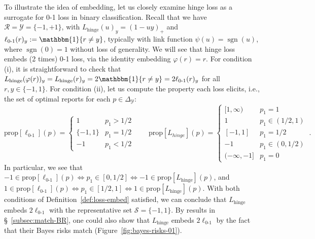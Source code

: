 \documentclass[twoside,11pt]{article}
\newcommand{\prop}[1]{\mathrm{prop}[#1]}
\newcommand{\simplex}{\Delta_\Y}
\newcommand{\R}{\mathcal{R}}
\newcommand{\Sc}{\mathcal{S}}
\newcommand{\Y}{\mathcal{Y}}
\newcommand{\ones}{\mathbbm{1}}
\newcommand{\Ind}[1]{\ones\{#1\}}
\newcommand{\hinge}{L_{\mathrm{hinge}}}
\newcommand{\ellzo}{\ell_{\text{0-1}}}
\DeclareMathOperator*{\sgn}{sgn}
\begin{document}
To illustrate the idea of embedding, let us closely examine hinge loss as a surrogate for 0-1 loss in binary classification.
Recall that we have $\R = \Y = \{-1, +1\}$, with $\hinge(u)_y = (1 - uy)_+$ and $\ellzo(r)_y := \Ind{r\neq y}$, typically with link function $\psi(u) = \sgn(u)$, where $\sgn(0) = 1$ without loss of generality.
We will see that hinge loss embeds (2 times) 0-1 loss, via the identity embedding $\varphi(r) = r$.
For condition (i), it is straightforward to check that $\hinge(\varphi(r))_y = \hinge(r)_y = 2 \Ind{r \neq y} = 2\ellzo(r)_y$ for all $r,y\in\{-1,1\}$.
For condition (ii), let us compute the property each loss elicits, i.e., the set of optimal reports for each $p\in\simplex$:
\[
\prop{\ellzo}(p) = \begin{cases}
1 & p_1 > 1/2 \\
\{-1,1\} & p_1 = 1/2\\
-1 & p_1 < 1/2
\end{cases}
\qquad
\prop{L_{hinge}}(p) = \begin{cases}
[1,\infty) & p_1 = 1\\
1 & p_1 \in (1/2,1) \\
[-1,1] & p_1 = 1/2\\
-1& p_1 \in (0, 1/2)\\
(-\infty, -1]& p_1 = 0
\end{cases}~.
\]
In particular, we see that $-1 \in \prop{\ellzo}(p) \iff p_1 \in [0, 1/2] \iff -1 \in \prop{\hinge}(p)$, and $1 \in \prop{\ellzo}(p) \iff p_1 \in [1/2,1] \iff 1 \in \prop{\hinge}(p)$.
With both conditions of Definition~\ref{def:loss-embed} satisfied, we can conclude that $\hinge$ embeds $2\ellzo$ with the representative set $\Sc = \{-1,1\}$.
By results in \S~\ref{subsec:match-BR}, one could also show that $\hinge$ embeds $2\ellzo$ by the fact that their Bayes risks match (Figure~\ref{fig:bayes-risks-01}).
\end{document}

